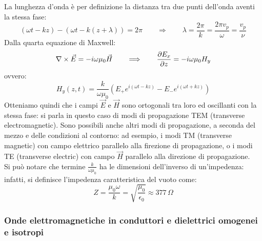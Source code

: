 \documentclass[]{article}
\begin{document}
La lunghezza d'onda è per definizione la distanza tra due punti dell'onda aventi la stessa fase:
\begin{equation}
	(\omega t - kz) - (\omega t - k (z + \lambda)) = 2\pi \qquad\Longrightarrow\qquad \lambda = \frac{2\pi}{k} = \frac{2\pi v_p}{\omega} = \frac{v_p}{\nu}
	\label{eq:14}
\end{equation}
Dalla quarta equazione di Maxwell:
\begin{equation}
	\nabla\times\vec{E} = -i\omega \mu_0 \vec{H} \qquad\Longrightarrow\qquad \frac{\partial E_x}{\partial z} = -i\omega \mu_0 H_y
	\label{eq:15}
\end{equation}
ovvero:
\begin{equation}
	H_y (z,t) = \frac{k}{\omega \mu_0} \left(E_+ e^{i(\omega t - kz)} - E_- e^{i(\omega t + kz)}\right)
	\label{eq:16}
\end{equation}
Otteniamo quindi che i campi $ \vec{E} $ e $ \vec{H} $ sono ortogonali tra loro ed oscillanti con la stessa fase: si parla in questo caso di modi di propagazione TEM (transverse electromagnetic). Sono possibili anche altri modi di propagazione, a seconda del mezzo e delle condizioni al contorno: ad esempio, i modi TM (transverse magnetic) con campo elettrico parallelo alla firezione di propagazione, o i modi TE (transverse electric) con campo $ \vec{H} $ parallelo alla direzione di propagazione. \\ 
%
Si può notare che termine $ \frac{k}{\omega\mu_0} $ ha le dimensioni dell'inverso di un'impedenza: infatti, si definisce l'impedenza caratteristica del vuoto come:
\begin{equation}
	Z = \frac{\mu_0 \omega}{k} = \sqrt{\frac{\mu_0}{\epsilon_0}} \approx 377 \,\Omega
	\label{eq:17}
\end{equation}

\subsubsection{Onde elettromagnetiche in conduttori e dielettrici omogenei e isotropi}
\end{document}
